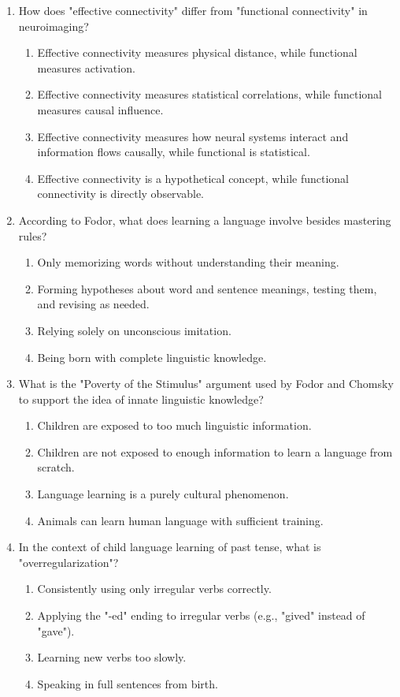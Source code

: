 \documentclass{article}
\begin{document}
\begin{enumerate}[label=\arabic*.]
\item How does "effective connectivity" differ from "functional connectivity" in neuroimaging?
\begin{enumerate}[label=(\alph*)]
    \item Effective connectivity measures physical distance, while functional measures activation.
    \item Effective connectivity measures statistical correlations, while functional measures causal influence.
    \item Effective connectivity measures how neural systems interact and information flows causally, while functional is statistical.
    \item Effective connectivity is a hypothetical concept, while functional connectivity is directly observable.
\end{enumerate}

\item According to Fodor, what does learning a language involve besides mastering rules?
\begin{enumerate}[label=(\alph*)]
    \item Only memorizing words without understanding their meaning.
    \item Forming hypotheses about word and sentence meanings, testing them, and revising as needed.
    \item Relying solely on unconscious imitation.
    \item Being born with complete linguistic knowledge.
\end{enumerate}

\item What is the "Poverty of the Stimulus" argument used by Fodor and Chomsky to support the idea of innate linguistic knowledge?
\begin{enumerate}[label=(\alph*)]
    \item Children are exposed to too much linguistic information.
    \item Children are not exposed to enough information to learn a language from scratch.
    \item Language learning is a purely cultural phenomenon.
    \item Animals can learn human language with sufficient training.
\end{enumerate}

\item In the context of child language learning of past tense, what is "overregularization"?
\begin{enumerate}[label=(\alph*)]
    \item Consistently using only irregular verbs correctly.
    \item Applying the "-ed" ending to irregular verbs (e.g., "gived" instead of "gave").
    \item Learning new verbs too slowly.
    \item Speaking in full sentences from birth.
\end{enumerate}


\end{enumerate}
\end{document}
